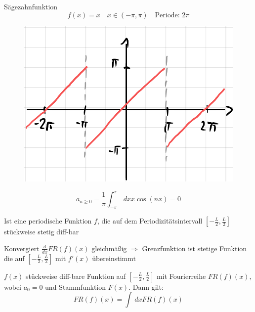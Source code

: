 \begin{Bsp}{Sägezahnfunktion}
	$$f(x)=x \quad x \in (-\pi,\pi) \quad \textrm{Periode: } 2\pi$$
	\begin{figure}[H]
		\centering
		\includegraphics[width=0.4\linewidth]{Grafiken/2_Fourierreihen/Grafik3.PNG}
	\end{figure}

	$$a_{n \geq 0} = \frac{1}{\pi} \int_{-\pi}^{\pi} \,dx x \cos(nx) = 0$$
\end{Bsp}

\begin{Satz}
	Ist eine periodische Funktion $f$, die auf dem Periodizitätsintervall
	$[-\frac{L}{2}, \frac{L}{2}]$ stückweise stetig diff-bar
\end{Satz}

\begin{Bem}
	Konvergiert $\frac{d}{dx} FR(f)(x)$ gleichmäßig $\Rightarrow$
	Grenzfunktion ist stetige Funktion die auf $[-\frac{L}{2}, \frac{L}{2}]$
	mit $f'(x)$ übereinstimmt
\end{Bem}

\begin{Satz}
	$f(x)$ stückweise diff-bare Funktion auf $[-\frac{L}{2}, \frac{L}{2}]$ mit
	Fourierreihe $FR(f)(x)$, wobei $a_0 = 0$ und Stammfunktion $F(x)$.
	Dann gilt:
	$$FR(f)(x) = \int \,dx FR(f)(x)$$
\end{Satz}








